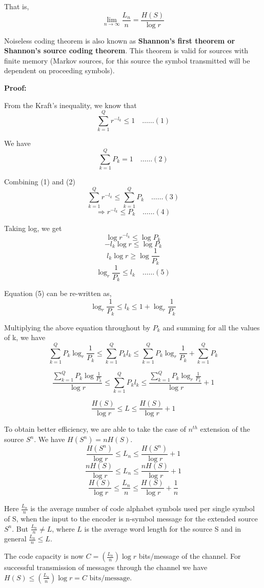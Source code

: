\documentclass[12pt]{article}
\begin{document}
That is, $$\lim_{n \rightarrow \infty} \frac{L_n}{n} = \frac{H(S)}{\log r}$$


Noiseless coding theorem is also known as \textbf{Shannon's first theorem or Shannon's source coding theorem}. This theorem is valid for sources with finite memory (Markov sources, for this source the symbol transmitted will be dependent on proceeding symbols).

\textbf{Proof:}

From the Kraft's inequality, we know that
$$\sum_{k=1}^{Q} r^{-l_k} \le 1 \quad \ldots\ldots(1)$$

We have
$$\sum_{k=1}^{Q} P_k = 1 \quad \ldots\ldots(2)$$

Combining (1) and (2)
$$\sum_{k=1}^{Q} r^{-l_k} \le \sum_{k=1}^{Q} P_k \quad \ldots\ldots(3)$$
$$\Rightarrow r^{-l_k} \le P_k \quad \ldots\ldots(4)$$

Taking log, we get
$$\log r^{-l_k} \le \log P_k$$
$$-l_k \log r \le \log P_k$$
$$l_k \log r \ge \log \frac{1}{P_k}$$
$$\log_r \frac{1}{P_k} \le l_k \quad \ldots\ldots(5)$$

Equation (5) can be re-written as,
$$\log_r \frac{1}{P_k} \le l_k \le 1 + \log_r \frac{1}{P_k}$$

Multiplying the above equation throughout by $P_k$ and summing for all the values of k, we have
$$\sum_{k=1}^{Q} P_k \log_r \frac{1}{P_k} \le \sum_{k=1}^{Q} P_k l_k \le \sum_{k=1}^{Q} P_k \log_r \frac{1}{P_k} + \sum_{k=1}^{Q} P_k$$

$$\frac{\sum_{k=1}^{Q} P_k \log \frac{1}{P_k}}{\log r} \le \sum_{k=1}^{Q} P_k l_k \le \frac{\sum_{k=1}^{Q} P_k \log_r \frac{1}{P_k}}{\log r} + 1$$

$$\frac{H(S)}{\log r} \le L \le \frac{H(S)}{\log r} + 1$$

To obtain better efficiency, we are able to take the case of $n^{th}$ extension of the source $S^n$. We have $H(S^n) = n H(S)$.
$$\frac{H(S^n)}{\log r} \le L_n \le \frac{H(S^n)}{\log r} + 1$$
$$\frac{n H(S)}{\log r} \le L_n \le \frac{n H(S)}{\log r} + 1$$
$$\frac{H(S)}{\log r} \le \frac{L_n}{n} \le \frac{H(S)}{\log r} + \frac{1}{n}$$

Here $\frac{L_n}{n}$ is the average number of code alphabet symbols used per single symbol of S, when the input to the encoder is n-symbol message for the extended source $S^n$.
But $\frac{L_n}{n} \ne L$, where $L$ is the average word length for the source S and in general $\frac{L_n}{n} \le L$.

The code capacity is now $C = (\frac{L_n}{n}) \log r$ bits/message of the channel. For successful transmission of messages through the channel we have $H(S) \le (\frac{L_n}{n}) \log r = C \text{ bits/message}$.
\end{document}
